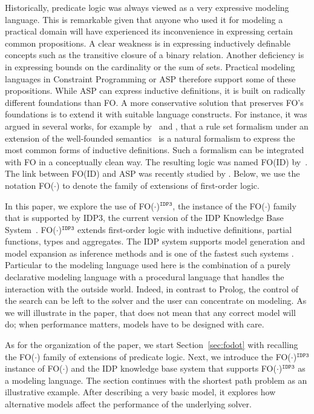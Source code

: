 \documentclass{tlp}
\newcommand{\idp}{{\sc IDP}\xspace}
\newcommand{\idpdrie}{{\sc IDP3}\xspace}
\newcommand{\fodotidp}{{\sc FO($\cdot$)$^{\mathtt{IDP3}}$}\xspace}
\newcommand{\fodot}{{\sc FO($\cdot$)}\xspace}
\newcommand{\fodotid}{{\sc FO(ID)}\xspace}
\renewcommand{\|}{\ensuremath{\,|\,}}
\renewcommand{\|}{\,|\,}
\begin{document}
Historically, predicate logic was always viewed as a very expressive
modeling language. This is remarkable given that anyone who used it
for modeling a practical domain will have experienced its
inconvenience in expressing certain common propositions. A clear
weakness is in expressing inductively definable concepts such as the
transitive closure of a binary relation. Another deficiency is in
expressing bounds on the cardinality or the sum of sets. Practical
modeling languages in Constraint Programming or ASP therefore support
some of these propositions. While ASP can express inductive
definitions, it is built on radically different foundations than FO. A
more conservative solution that preserves FO's foundations is to
extend it with suitable language constructs. For instance, it was
argued in several works, for example by~ and
, that a rule set formalism under an extension
of the well-founded semantics~\cite{GelderRS91} is a natural formalism
to express the most common forms of inductive definitions. Such a
formalism can be integrated with FO in a conceptually clean way.  The
resulting logic was named \fodotid by~. The
link between \fodotid and ASP was recently studied by
.  Below, we use the notation \fodot to denote the
family of extensions of first-order logic.

In this paper, we explore the use of \fodotidp, the instance of the
\fodot family that is supported by \idpdrie, the current version of
the \idp Knowledge Base System~\cite{inap/DePooterWD11}. \fodotidp
extends first-order logic with inductive definitions, partial
functions, types and aggregates. The \idp system supports model
generation and model expansion \cite{MitchellT05,atcl/Wittocx13}  as inference
methods and is one of the fastest such systems \cite{LPNRM/Calimeri11}. Particular to the modeling language used here is the
combination of a purely declarative modeling language with a
procedural language that handles the interaction with the outside
world. Indeed, in contrast to Prolog, the control of the search can be
left to the solver and the user can concentrate on modeling.  As we
will illustrate in the paper, that does not mean that any correct
model will do; when performance matters, models have to be designed
with care. 

As for the organization of the paper, we start Section~\ref{sec:fodot}
with recalling the \fodot family of extensions of predicate
logic. Next, we introduce the \fodotidp instance of \fodot and the
\idp knowledge base system that supports \fodotidp as a modeling
language. The section continues with the shortest path problem as an
illustrative example.  After describing a very basic model, it
explores how alternative models affect the performance of the
underlying solver.
\end{document}
